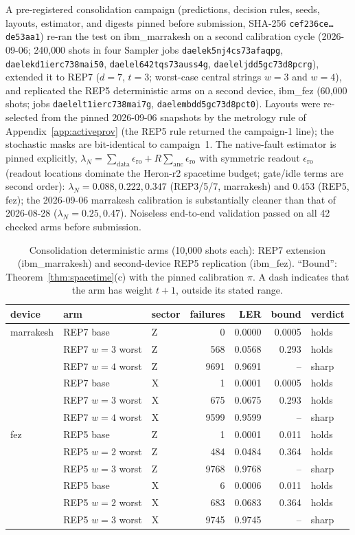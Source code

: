 \documentclass[pdflatex,sn-mathphys-num]{sn-jnl}
\theoremstyle{thmstyleone}
\theoremstyle{thmstyletwo}
\theoremstyle{thmstylethree}
\begin{document}
A pre-registered consolidation campaign (predictions, decision rules, seeds, layouts, estimator, and digests pinned before submission, SHA-256 \texttt{cef236ce\dots de53aa1}) re-ran the test on ibm\_marrakesh on a second calibration cycle (2026-09-06; 240{,}000 shots in four Sampler jobs \texttt{daelek5nj4cs73afaqpg}, \texttt{daelekd1ierc738mai50}, \texttt{daelel642tqs73auss4g}, \texttt{daeleljdd5gc73d8pcrg}), extended it to REP7 ($d{=}7$, $t{=}3$; worst-case central strings $w{=}3$ and $w{=}4$), and replicated the REP5 deterministic arms on a second device, ibm\_fez (60{,}000 shots; jobs \texttt{daelelt1ierc738mai7g}, \texttt{daelembdd5gc73d8pct0}). Layouts were re-selected from the pinned 2026-09-06 snapshots by the metrology rule of Appendix~\ref{app:activeprov} (the REP5 rule returned the campaign-1 line); the stochastic masks are bit-identical to campaign~1. The native-fault estimator is pinned explicitly, $\lambda_N=\sum_{\mathrm{data}}\epsilon_{\mathrm{ro}}+ R\sum_{\mathrm{anc}}\epsilon_{\mathrm{ro}}$ with symmetric readout $\epsilon_{\mathrm{ro}}$ (readout locations dominate the Heron-r2 spacetime budget; gate/idle terms are second order): $\lambda_N{=}0.088, 0.222, 0.347$ (REP3/5/7, marrakesh) and $0.453$ (REP5, fez); the 2026-09-06 marrakesh calibration is substantially cleaner than that of 2026-08-28 ($\lambda_N{=}0.25, 0.47$). Noiseless end-to-end validation passed on all 42 checked arms before submission.

\begin{table}[htbp]\centering\small
\caption{Consolidation deterministic arms (10{,}000 shots each): REP7 extension (ibm\_marrakesh) and second-device REP5 replication (ibm\_fez). ``Bound'': Theorem~\ref{thm:spacetime}(c) with the pinned calibration $\pi$. A dash indicates that the arm has weight $t+1$, outside its stated range.}
\label{tab:injrepl}
\begin{tabular}{@{}lllrrrl@{}}
\toprule
device & arm & sector & failures & LER & bound & verdict \\\midrule
marrakesh & REP7 base & Z & 0 & 0.0000 & 0.0005 & holds \\
 & REP7 $w{=}3$ worst & Z & 568 & 0.0568 & 0.293 & holds \\
 & REP7 $w{=}4$ worst & Z & 9691 & 0.9691 &--& sharp \\
 & REP7 base & X & 1 & 0.0001 & 0.0005 & holds \\
 & REP7 $w{=}3$ worst & X & 675 & 0.0675 & 0.293 & holds \\
 & REP7 $w{=}4$ worst & X & 9599 & 0.9599 &--& sharp \\\midrule
fez & REP5 base & Z & 1 & 0.0001 & 0.011 & holds \\
 & REP5 $w{=}2$ worst & Z & 484 & 0.0484 & 0.364 & holds \\
 & REP5 $w{=}3$ worst & Z & 9768 & 0.9768 &--& sharp \\
 & REP5 base & X & 6 & 0.0006 & 0.011 & holds \\
 & REP5 $w{=}2$ worst & X & 683 & 0.0683 & 0.364 & holds \\
 & REP5 $w{=}3$ worst & X & 9745 & 0.9745 &--& sharp \\\bottomrule
\end{tabular}
\end{table}
\end{document}
